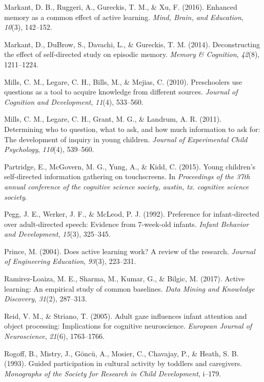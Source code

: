 \documentclass[a4paper,man,apacite,floatsintext]{apa6}
\begin{document}
\hypertarget{ref-markant2016enhanced}{}
Markant, D. B., Ruggeri, A., Gureckis, T. M., \& Xu, F. (2016). Enhanced
memory as a common effect of active learning. \emph{Mind, Brain, and
Education}, \emph{10}(3), 142--152.

\hypertarget{ref-markant2014deconstructing}{}
Markant, D., DuBrow, S., Davachi, L., \& Gureckis, T. M. (2014).
Deconstructing the effect of self-directed study on episodic memory.
\emph{Memory \& Cognition}, \emph{42}(8), 1211--1224.

\hypertarget{ref-mills2010preschoolers}{}
Mills, C. M., Legare, C. H., Bills, M., \& Mejias, C. (2010).
Preschoolers use questions as a tool to acquire knowledge from different
sources. \emph{Journal of Cognition and Development}, \emph{11}(4),
533--560.

\hypertarget{ref-mills2011determining}{}
Mills, C. M., Legare, C. H., Grant, M. G., \& Landrum, A. R. (2011).
Determining who to question, what to ask, and how much information to
ask for: The development of inquiry in young children. \emph{Journal of
Experimental Child Psychology}, \emph{110}(4), 539--560.

\hypertarget{ref-partridge2015young}{}
Partridge, E., McGovern, M. G., Yung, A., \& Kidd, C. (2015). Young
children's self-directed information gathering on touchscreens. In
\emph{Proceedings of the 37th annual conference of the cognitive science
society, austin, tx. cognitive science society}.

\hypertarget{ref-pegg1992preference}{}
Pegg, J. E., Werker, J. F., \& McLeod, P. J. (1992). Preference for
infant-directed over adult-directed speech: Evidence from 7-week-old
infants. \emph{Infant Behavior and Development}, \emph{15}(3), 325--345.

\hypertarget{ref-prince2004does}{}
Prince, M. (2004). Does active learning work? A review of the research.
\emph{Journal of Engineering Education}, \emph{93}(3), 223--231.

\hypertarget{ref-ramirez2017active}{}
Ramirez-Loaiza, M. E., Sharma, M., Kumar, G., \& Bilgic, M. (2017).
Active learning: An empirical study of common baselines. \emph{Data
Mining and Knowledge Discovery}, \emph{31}(2), 287--313.

\hypertarget{ref-reid2005adult}{}
Reid, V. M., \& Striano, T. (2005). Adult gaze influences infant
attention and object processing: Implications for cognitive
neuroscience. \emph{European Journal of Neuroscience}, \emph{21}(6),
1763--1766.

\hypertarget{ref-rogoff1993guided}{}
Rogoff, B., Mistry, J., Göncü, A., Mosier, C., Chavajay, P., \& Heath,
S. B. (1993). Guided participation in cultural activity by toddlers and
caregivers. \emph{Monographs of the Society for Research in Child
Development}, i--179.
\end{document}
